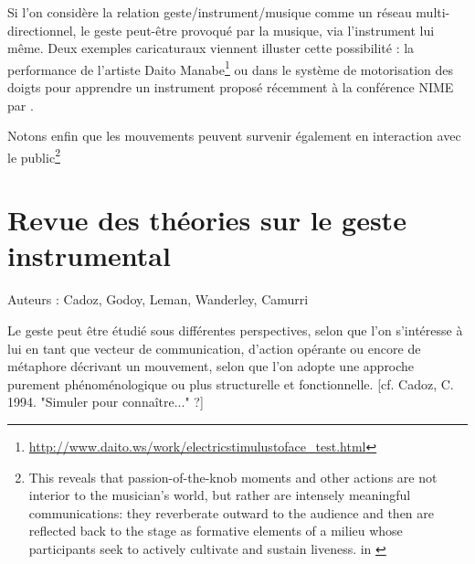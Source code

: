 
Si l'on considère la relation geste/instrument/musique comme un réseau multi-directionnel, le geste peut-être provoqué par la musique, via l'instrument lui même. Deux exemples caricaturaux viennent illuster cette possibilité : la performance  de l'artiste Daito Manabe\footnote{\url{http://www.daito.ws/work/electricstimulustoface_test.html}} ou dans le système de motorisation des doigts pour apprendre un instrument proposé récemment à la conférence NIME par \cite{zhang_adaptive_2019}.


Notons enfin que les mouvements peuvent survenir également en interaction avec le public\footnote{This reveals that passion-of-the-knob moments and other actions are not interior to the musician’s world, but rather are intensely meaningful communications: they reverberate outward to the audience and then are reflected back to the stage as formative elements of a milieu whose participants seek to actively cultivate and sustain liveness. in \cite{butler_playing_2014}} 

\section{Revue des théories sur le geste instrumental}

Auteurs : Cadoz, Godoy, Leman, Wanderley, Camurri 

Le geste peut être étudié sous différentes perspectives, selon que l'on s'intéresse à lui en tant que vecteur de communication, d'action opérante ou encore de métaphore décrivant un mouvement, selon que l'on adopte une approche purement phénoménologique ou plus structurelle et fonctionnelle. [cf. Cadoz, C. 1994. "Simuler pour connaître..." ?]




